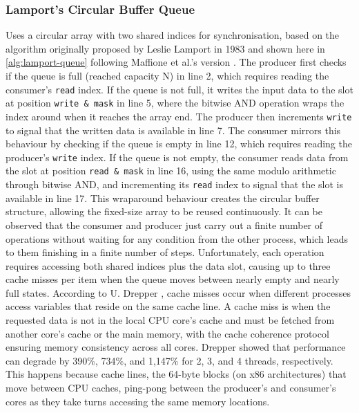 \subsubsection{Lamport's Circular Buffer Queue}\label{subsubsec:lamport-circular-buffer-queue}
Uses a circular array with two shared indices for synchronisation, based on the algorithm originally proposed by Leslie Lamport in 1983 \cite{Lamport1983SPSCCircularBuffer} and shown here in \cref{alg:lamport-queue} following Maffione et al.'s version \cite{MaffioneCacheAware}. The producer first checks if the queue is full (reached capacity N) in line 2, which requires reading the consumer's \texttt{read} index. If the queue is not full, it writes the input data to the slot at position \texttt{write \& mask} in line 5, where the bitwise AND operation wraps the index around when it reaches the array end. The producer then increments \texttt{write} to signal that the written data is available in line 7. The consumer mirrors this behaviour by checking if the queue is empty in line 12, which requires reading the producer's \texttt{write} index. If the queue is not empty, the consumer reads data from the slot at position \texttt{read \& mask} in line 16, using the same modulo arithmetic through bitwise AND, and incrementing its \texttt{read} index to signal that the slot is available in line 17. This wraparound behaviour creates the circular buffer structure, allowing the fixed-size array to be reused continuously. It can be observed that the consumer and producer just carry out a finite number of operations without waiting for any condition from the other process, which leads to them finishing in a finite number of steps. Unfortunately, each operation requires accessing both shared indices plus the data slot, causing up to three cache misses per item when the queue moves between nearly empty and nearly full states. According to U. Drepper \cite{drepper2007every}, cache misses occur when different processes access variables that reside on the same cache line. A cache miss is when the requested data is not in the local CPU core's cache and must be fetched from another core's cache or the main memory, with the cache coherence protocol ensuring memory consistency across all cores. Drepper showed that performance can degrade by 390\%, 734\%, and 1,147\% for 2, 3, and 4 threads, respectively. This happens because cache lines, the 64-byte blocks (on x86 architectures) that move between CPU caches, ping-pong between the producer's and consumer's cores as they take turns accessing the same memory locations.

